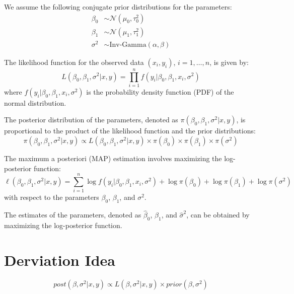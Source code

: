 \documentclass[12pt,a4paper]{article}
\begin{document}
We assume the following conjugate prior distributions for the parameters:
\begin{align*}
\beta_0 & \sim \mathcal{N}(\mu_0, \tau_0^2) \\
\beta_1 & \sim \mathcal{N}(\mu_1, \tau_1^2) \\
\sigma^2 & \sim \text{Inv-Gamma}(\alpha, \beta)
\end{align*}

The likelihood function for the observed data $(x_i, y_i)$, $i = 1, \ldots, n$, is given by:
\begin{equation*}
L(\beta_0, \beta_1, \sigma^2 | x, y) = \prod_{i=1}^{n} f(y_i | \beta_0, \beta_1, x_i, \sigma^2)
\end{equation*}
where $f(y_i | \beta_0, \beta_1, x_i, \sigma^2)$ is the probability density function (PDF) of the normal distribution.

The posterior distribution of the parameters, denoted as $\pi(\beta_0, \beta_1, \sigma^2 | x, y)$, is proportional to the product of the likelihood function and the prior distributions:
\begin{equation*}
\pi(\beta_0, \beta_1, \sigma^2 | x, y) \propto L(\beta_0, \beta_1, \sigma^2 | x, y) \times \pi(\beta_0) \times \pi(\beta_1) \times \pi(\sigma^2)
\end{equation*}

The maximum a posteriori (MAP) estimation involves maximizing the log-posterior function:
\begin{equation*}
\ell(\beta_0, \beta_1, \sigma^2 | x, y) = \sum_{i=1}^{n} \log f(y_i | \beta_0, \beta_1, x_i, \sigma^2) + \log \pi(\beta_0) + \log \pi(\beta_1) + \log \pi(\sigma^2)
\end{equation*}
with respect to the parameters $\beta_0$, $\beta_1$, and $\sigma^2$.

The estimates of the parameters, denoted as $\hat{\beta}_0$, $\hat{\beta}_1$, and $\hat{\sigma}^2$, can be obtained by maximizing the log-posterior function.

\newpage

\section{Derviation Idea}
\begin{equation*}
post(\beta, \sigma^2 | x, y) \propto L(\beta, \sigma^2 | x, y) \times prior(\beta, \sigma^2)
\end{equation*}
\end{document}
